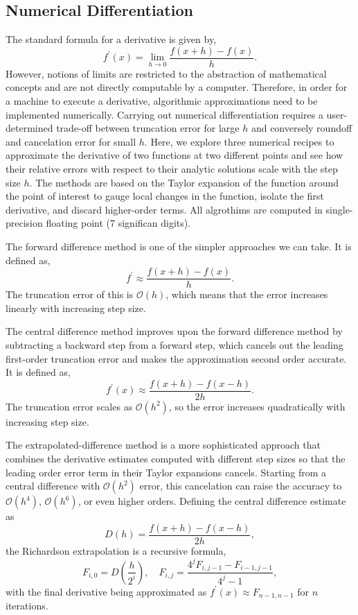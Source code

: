 \documentclass[a4paper,11pt]{article}
\begin{document}
\subsection*{Numerical Differentiation}

The standard formula for a derivative is given by, \[ f^\prime (x) = \lim_{h \to 0} \frac{f(x+h) - f(x)}{h}.\] However, notions of limits are restricted to the abstraction of mathematical concepts and are not directly computable by a computer. Therefore, in order for a machine to execute a derivative, algorithmic approximations need to be implemented numerically. Carrying out numerical differentiation requires a user-determined trade-off between truncation error for large $h$ and conversely roundoff and cancelation error for small $h$. Here, we explore three numerical recipes to approximate the derivative of two functions at two different points and see how their relative errors with respect to their analytic solutions scale with the step size $h$. The methods are based on the Taylor expansion of the function around the point of interest to gauge local changes in the function, isolate the first derivative, and discard higher-order terms. All algrothims are computed in single-precision floating point (7 significan digits). 

The forward difference method is one of the simpler approaches we can take. It is defined as, \[f^\prime \approx \frac{f(x+h) - f(x)}{h}.\] The truncation error of this is $\mathcal{O}(h)$, which means that the error increases linearly with increasing step size. 

The central difference method improves upon the forward difference method by subtracting a backward step from a forward step, which cancels out the leading first-order truncation error and makes the approximation second order accurate. It is defined as, \[f^\prime(x) \approx \frac{f(x+h) - f(x-h)}{2h}.\] The truncation error scales as $\mathcal{O}(h^2)$, so the error increases quadratically with increasing step size.

The extrapolated-difference method is a more sophisticated approach that combines the derivative estimates computed with different step sizes so that the leading order error term in their Taylor expansions cancels. Starting from a central difference with $\mathcal{O}(h^2)$ error, this cancelation can raise the accuracy to $\mathcal{O}(h^4)$, $\mathcal{O}(h^6)$, or even higher orders. Defining the central difference estimate as \[ D(h) = \frac{f(x+h) - f(x-h)}{2h}, \] the Richardson extrapolation is a recursive formula, \[F_{i,0} = D(\frac{h}{2^i}), \quad F_{i,j} = \frac{4^j F_{i, j-1} - F_{i-1, j-1}}{4^j -1}, \] with the final derivative being approximated as $f^\prime(x) \approx F_{n-1, n-1}$ for $n$ iterations.
\end{document}
